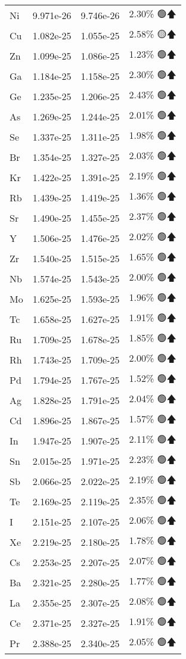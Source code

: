 \begin{longtable}{|l|c|c|c|}
Ni & 9.971e-26 & 9.746e-26 & 2.30\% 🟢🡅 \\
Cu & 1.082e-25 & 1.055e-25 & 2.58\% 🟡🡅 \\
Zn & 1.099e-25 & 1.086e-25 & 1.23\% 🟢🡅 \\
Ga & 1.184e-25 & 1.158e-25 & 2.30\% 🟢🡅 \\
Ge & 1.235e-25 & 1.206e-25 & 2.43\% 🟢🡅 \\
As & 1.269e-25 & 1.244e-25 & 2.01\% 🟢🡅 \\
Se & 1.337e-25 & 1.311e-25 & 1.98\% 🟢🡅 \\
Br & 1.354e-25 & 1.327e-25 & 2.03\% 🟢🡅 \\
Kr & 1.422e-25 & 1.391e-25 & 2.19\% 🟢🡅 \\
Rb & 1.439e-25 & 1.419e-25 & 1.36\% 🟢🡅 \\
Sr & 1.490e-25 & 1.455e-25 & 2.37\% 🟢🡅 \\
Y & 1.506e-25 & 1.476e-25 & 2.02\% 🟢🡅 \\
Zr & 1.540e-25 & 1.515e-25 & 1.65\% 🟢🡅 \\
Nb & 1.574e-25 & 1.543e-25 & 2.00\% 🟢🡅 \\
Mo & 1.625e-25 & 1.593e-25 & 1.96\% 🟢🡅 \\
Tc & 1.658e-25 & 1.627e-25 & 1.91\% 🟢🡅 \\
Ru & 1.709e-25 & 1.678e-25 & 1.85\% 🟢🡅 \\
Rh & 1.743e-25 & 1.709e-25 & 2.00\% 🟢🡅 \\
Pd & 1.794e-25 & 1.767e-25 & 1.52\% 🟢🡅 \\
Ag & 1.828e-25 & 1.791e-25 & 2.04\% 🟢🡅 \\
Cd & 1.896e-25 & 1.867e-25 & 1.57\% 🟢🡅 \\
In & 1.947e-25 & 1.907e-25 & 2.11\% 🟢🡅 \\
Sn & 2.015e-25 & 1.971e-25 & 2.23\% 🟢🡅 \\
Sb & 2.066e-25 & 2.022e-25 & 2.19\% 🟢🡅 \\
Te & 2.169e-25 & 2.119e-25 & 2.35\% 🟢🡅 \\
I & 2.151e-25 & 2.107e-25 & 2.06\% 🟢🡅 \\
Xe & 2.219e-25 & 2.180e-25 & 1.78\% 🟢🡅 \\
Cs & 2.253e-25 & 2.207e-25 & 2.07\% 🟢🡅 \\
Ba & 2.321e-25 & 2.280e-25 & 1.77\% 🟢🡅 \\
La & 2.355e-25 & 2.307e-25 & 2.08\% 🟢🡅 \\
Ce & 2.371e-25 & 2.327e-25 & 1.91\% 🟢🡅 \\
Pr & 2.388e-25 & 2.340e-25 & 2.05\% 🟢🡅 \\

\end{longtable}
